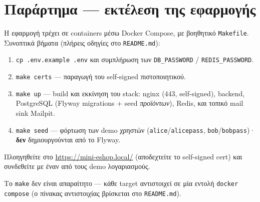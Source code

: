 \documentclass[11pt,a4paper]{article}
\newcommand{\code}[1]{\texttt{#1}}
\begin{document}
\section*{Παράρτημα --- εκτέλεση της εφαρμογής}

Η εφαρμογή τρέχει σε containers μέσω Docker Compose, με βοηθητικό \code{Makefile}. Συνοπτικά
βήματα (πλήρεις οδηγίες στο \code{README.md}):

\begin{enumerate}[leftmargin=2em]\setlength\itemsep{2pt}
    \item \code{cp .env.example .env} και συμπλήρωση των \code{DB\_PASSWORD} / \code{REDIS\_PASSWORD}.
    \item \code{make certs} --- παραγωγή του self-signed πιστοποιητικού.
    \item \code{make up} --- build και εκκίνηση του stack: nginx (443, self-signed), backend,
          PostgreSQL (Flyway migrations + seed \emph{προϊόντων}), Redis, και τοπικό mail sink Mailpit.
    \item \code{make seed} --- φόρτωση των demo χρηστών (\code{alice}/\code{alicepass},
          \code{bob}/\code{bobpass})· \textbf{δεν} δημιουργούνται από το Flyway.
\end{enumerate}

Πλοηγηθείτε στο \url{https://mini-eshop.local/} (αποδεχτείτε το self-signed cert) και συνδεθείτε με
έναν από τους demo λογαριασμούς.

Το \code{make} δεν είναι απαραίτητο --- κάθε target αντιστοιχεί σε μία εντολή \code{docker compose}
(ο πίνακας αντιστοιχίας βρίσκεται στο \code{README.md}).
\end{document}
